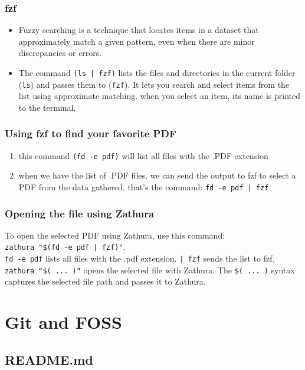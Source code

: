 \documentclass{article}
\begin{document}
        \subsubsection{fzf}
        \begin{itemize}
            \item Fuzzy searching is a technique that locates items in a dataset that approximately match a given pattern, even when there are minor discrepancies or errors.
            \item The command \texttt{(ls | fzf)} lists the files and directories in the current folder (\texttt{ls}) and passes them to (\texttt{fzf}). It lets you search and select items from the list using approximate matching. when you select an item, its name is printed to the terminal.
        \end{itemize}
        \subsubsection{Using fzf to find your favorite PDF}
        \begin{enumerate}
            \item this command \texttt{(fd -e pdf)} will list all files with the .PDF extension
            \item when we have the list of .PDF files, we can send the output to fzf to select a PDF from the data gathered. that’s the command: \texttt{fd -e pdf | fzf}
        \end{enumerate}
        \subsubsection{Opening the file using Zathura}
        To open the selected PDF using Zathura, use this command:\\ 
        \texttt{zathura "\$(fd -e pdf | fzf)"}.
        \\\texttt{fd -e pdf} lists all files with the .pdf extension. \texttt{| fzf} sends the list to fzf. \texttt{zathura "\$( ... )"} 
         opens the selected file with Zathura. The \texttt{\$( ... )} syntax captures the selected file path and passes it to Zathura.

\section{Git and FOSS}
    \subsection{README.md}
\end{document}
